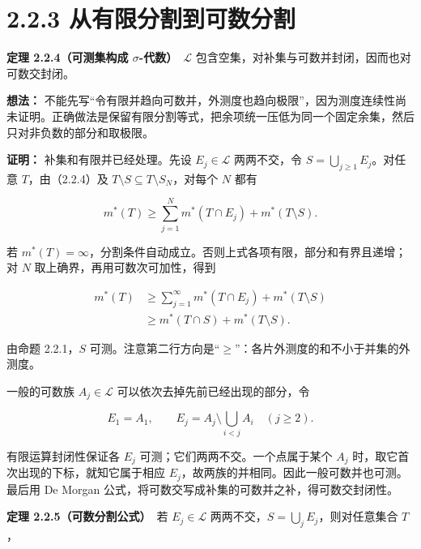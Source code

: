 \documentclass[11pt,a4paper]{article}
\begin{document}
\section[\S{}2.2.3
从有限分割到可数分割]{2.2.3
从有限分割到可数分割}\label{ux4eceux6709ux9650ux5206ux5272ux5230ux53efux6570ux5206ux5272}

\textbf{定理 2.2.4（可测集构成 \(\sigma\)-代数）}　\(\mathcal L\)
包含空集，对补集与可数并封闭，因而也对可数交封闭。

\textbf{想法：}
不能先写``令有限并趋向可数并，外测度也趋向极限''，因为测度连续性尚未证明。正确做法是保留有限分割等式，把余项统一压低为同一个固定余集，然后只对非负数的部分和取极限。

\textbf{证明：} 补集和有限并已经处理。先设 \(E_j\in\mathcal L\)
两两不交，令 \(S=\bigcup_{j\ge1}E_j\)。对任意 \(T\)，由（2.2.4）及
\(T\setminus S\subseteq T\setminus S_N\)，对每个 \(N\) 都有

\begin{equation*}
m^*(T)\ge\sum_{j=1}^N m^*(T\cap E_j)+m^*(T\setminus S).
\tag{2.2.5}
\end{equation*}

若
\(m^*(T)=\infty\)，分割条件自动成立。否则上式各项有限，部分和有界且递增；对
\(N\) 取上确界，再用可数次可加性，得到

\begin{equation*}
\begin{aligned}
m^*(T)
&\ge\sum_{j=1}^{\infty}m^*(T\cap E_j)+m^*(T\setminus S)\\
&\ge m^*(T\cap S)+m^*(T\setminus S).
\end{aligned}
\tag{2.2.6}
\end{equation*}

由命题 2.2.1，\(S\)
可测。注意第二行方向是``\(\ge\)''：各片外测度的和不小于并集的外测度。

一般的可数族 \(A_j\in\mathcal L\) 可以依次去掉先前已经出现的部分，令

\begin{equation*}
E_1=A_1,\qquad E_j=A_j\setminus\bigcup_{i<j}A_i\quad(j\ge2).
\tag{2.2.7}
\end{equation*}

有限运算封闭性保证各 \(E_j\) 可测；它们两两不交。一个点属于某个 \(A_j\)
时，取它首次出现的下标，就知它属于相应
\(E_j\)，故两族的并相同。因此一般可数并也可测。最后用 De Morgan
公式，将可数交写成补集的可数并之补，得可数交封闭性。

\textbf{定理 2.2.5（可数分割公式）}　若 \(E_j\in\mathcal L\)
两两不交，\(S=\bigcup_jE_j\)，则对任意集合 \(T\)，
\end{document}
